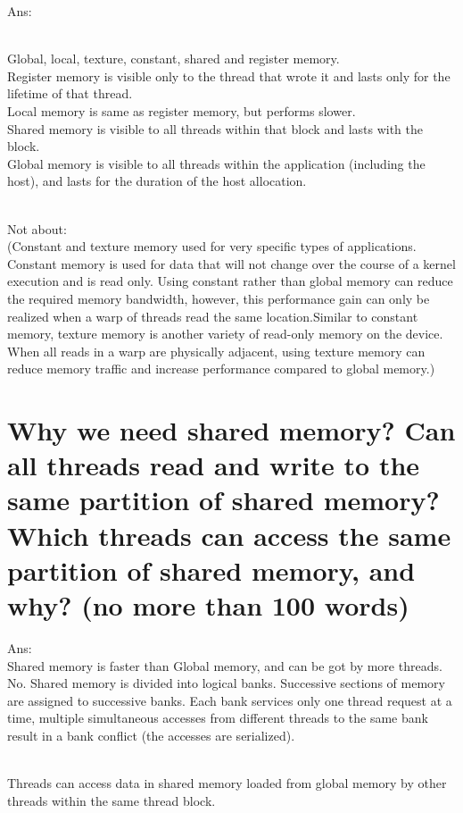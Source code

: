 \documentclass{article}
\begin{document}
Ans:%

~\\Global, local, texture, constant, shared and register memory. 
\\Register memory is visible only to the thread that wrote it and lasts only for the lifetime of that thread.
\\Local memory is same as register memory, but performs slower.
\\Shared memory is visible to all threads within that block and lasts with the block. 
\\Global memory is visible to all threads within the application (including the host), and lasts for the duration of the host allocation.

\\Not about:
\\(Constant and texture memory used for very specific types of applications. Constant memory is used for data that will not change over the course of a kernel execution and is read only. Using constant rather than global memory can reduce the required memory bandwidth, however, this performance gain can only be realized when a warp of threads read the same location.Similar to constant memory, texture memory is another variety of read-only memory on the device. When all reads in a warp are physically adjacent, using texture memory can reduce memory traffic and increase performance compared to global memory.)


\section{Why we need shared memory? Can all threads read and write to the same partition of shared memory? Which threads can access the same partition of shared memory, and why? (no more than 100 words)}

Ans:%
~\\Shared memory is faster than Global memory, and can be got by more threads.
\\No. Shared memory is divided into logical banks. Successive sections of memory are assigned to successive banks. Each bank services only one thread request at a time, multiple simultaneous accesses from different threads to the same bank result in a bank conflict (the accesses are serialized).

\\Threads can access data in shared memory loaded from global memory by other threads within the same thread block.
\end{document}
